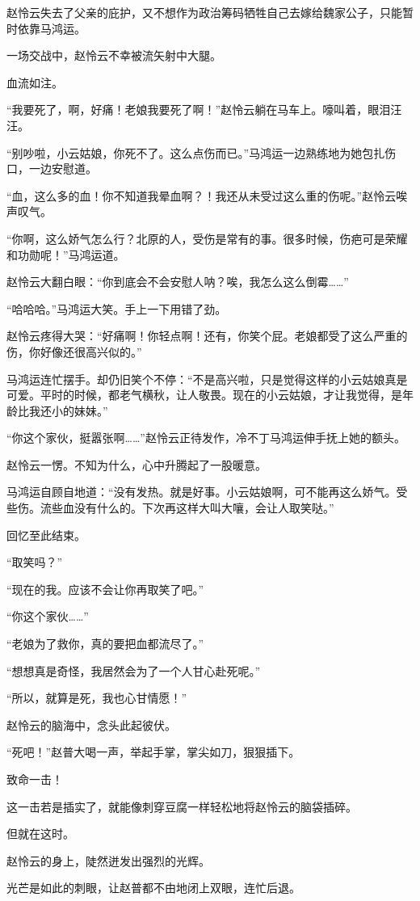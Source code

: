 \begin{this_body}
赵怜云失去了父亲的庇护，又不想作为政治筹码牺牲自己去嫁给魏家公子，只能暂时依靠马鸿运。

一场交战中，赵怜云不幸被流矢射中大腿。

血流如注。

“我要死了，啊，好痛！老娘我要死了啊！”赵怜云躺在马车上。嚎叫着，眼泪汪汪。

“别吵啦，小云姑娘，你死不了。这么点伤而已。”马鸿运一边熟练地为她包扎伤口，一边安慰道。

“血，这么多的血！你不知道我晕血啊？！我还从未受过这么重的伤呢。”赵怜云唉声叹气。

“你啊，这么娇气怎么行？北原的人，受伤是常有的事。很多时候，伤疤可是荣耀和功勋呢！”马鸿运道。

赵怜云大翻白眼：“你到底会不会安慰人呐？唉，我怎么这么倒霉……”

“哈哈哈。”马鸿运大笑。手上一下用错了劲。

赵怜云疼得大哭：“好痛啊！你轻点啊！还有，你笑个屁。老娘都受了这么严重的伤，你好像还很高兴似的。”

马鸿运连忙摆手。却仍旧笑个不停：“不是高兴啦，只是觉得这样的小云姑娘真是可爱。平时的时候，都老气横秋，让人敬畏。现在的小云姑娘，才让我觉得，是年龄比我还小的妹妹。”

“你这个家伙，挺嚣张啊……”赵怜云正待发作，冷不丁马鸿运伸手抚上她的额头。

赵怜云一愣。不知为什么，心中升腾起了一股暖意。

马鸿运自顾自地道：“没有发热。就是好事。小云姑娘啊，可不能再这么娇气。受些伤。流些血没有什么的。下次再这样大叫大嚷，会让人取笑哒。”

回忆至此结束。

“取笑吗？”

“现在的我。应该不会让你再取笑了吧。”

“你这个家伙……”

“老娘为了救你，真的要把血都流尽了。”

“想想真是奇怪，我居然会为了一个人甘心赴死呢。”

“所以，就算是死，我也心甘情愿！”

赵怜云的脑海中，念头此起彼伏。

“死吧！”赵普大喝一声，举起手掌，掌尖如刀，狠狠插下。

致命一击！

这一击若是插实了，就能像刺穿豆腐一样轻松地将赵怜云的脑袋插碎。

但就在这时。

赵怜云的身上，陡然迸发出强烈的光辉。

光芒是如此的刺眼，让赵普都不由地闭上双眼，连忙后退。


\end{this_body}
